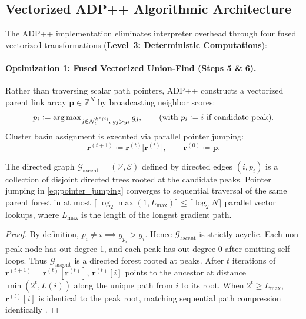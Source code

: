 \subsection{Vectorized ADP++ Algorithmic Architecture}
\label{subsec:adppp_vectorized}

The \textsc{ADP++} implementation eliminates interpreter overhead
through four fused vectorized transformations (\textbf{Level~3:
Deterministic Computations}):

\paragraph{Optimization 1: Fused Vectorized Union-Find (Steps 5 \& 6).}
Rather than traversing scalar path pointers, \textsc{ADP++}
constructs a vectorized parent link array $\mathbf{p} \in
\mathbb{Z}^N$ by broadcasting neighbor scores:
\begin{equation}
  p_i \mathrel{\mathop:}= \operatorname{arg\,max}_{j \in \mathcal{N}_i^{k^{*}(i)},\; g_j > g_i} g_j,
  \qquad (\text{with } p_i \mathrel{\mathop:}= i \text{ if candidate peak}).
  \label{eq:vectorized_parent}
\end{equation}
Cluster basin assignment is executed via parallel pointer jumping:
\begin{equation}
  \mathbf{r}^{(t+1)} \coloneqq \mathbf{r}^{(t)}\bigl[\mathbf{r}^{(t)}\bigr],
  \qquad \mathbf{r}^{(0)} \coloneqq \mathbf{p}.
  \label{eq:pointer_jumping}
\end{equation}

\begin{theorem}
  \label{thm:union_find_equivalence}
  The directed graph $\mathcal{G}_{\mathrm{ascent}} = (\mathcal{V},
  \mathcal{E})$ defined by directed edges $(i, p_i)$ is a collection
  of disjoint directed trees rooted at the candidate peaks. Pointer
  jumping in \cref{eq:pointer_jumping} converges to sequential traversal
  of the same parent forest in at most
  $\lceil\log_2\max(1,L_{\max})\rceil\le\lceil\log_2N\rceil$ parallel vector
  lookups, where $L_{\max}$ is the length of the longest gradient path.
\end{theorem}

\begin{proof}
  By definition, $p_i \ne i \implies g_{p_i} > g_i$. Hence
  $\mathcal{G}_{\mathrm{ascent}}$ is strictly acyclic. Each non-peak
  node has out-degree 1, and each peak has out-degree 0 after
  omitting self-loops.
  Thus $\mathcal{G}_{\mathrm{ascent}}$ is a directed forest rooted
  at peaks. After $t$ iterations of $\mathbf{r}^{(t+1)} =
  \mathbf{r}^{(t)}[\mathbf{r}^{(t)}]$, $\mathbf{r}^{(t)}[i]$ points
  to the ancestor at distance $\min(2^t,L(i))$ along the unique path from $i$
  to its root. When $2^t \ge L_{\max}$, $\mathbf{r}^{(t)}[i]$ is
  identical to the peak root, matching sequential path compression identically
  \parencite{tarjan1975}.
\end{proof}

